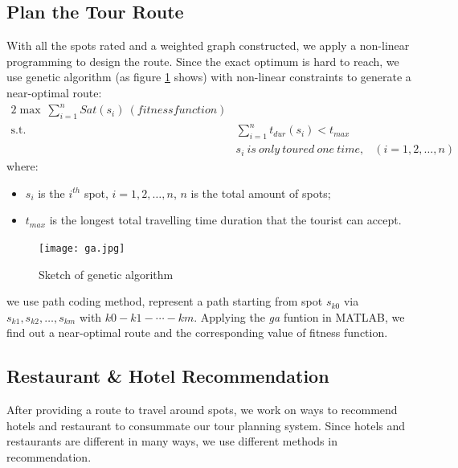 \documentclass{mcmthesis}
\begin{document}
\subsection{Plan the Tour Route}
  With all the spots rated and a weighted graph constructed, we apply a non-linear programming to design the route. Since the exact optimum is hard to reach, we use genetic algorithm (as figure \ref{fig:ga} shows) with non-linear constraints to generate a near-optimal route:
  \begin{alignat}{2}   %
    \max~\sum_{i=1}^{n}Sat(s_{i})~(fitness function)\\
    \mbox{s.t.}\quad
    &\sum_{i=1}^{n}t_{dur}(s_{i}) < t_{max}\\
    &s_{i}~is~only~toured~one~time, & (i=1,2,\ldots,n)
  \end{alignat}
  where:
  \begin{itemize}
    \item $s_{i}$ is the $i^{th}$ spot, $i=1,2,\ldots,n$, $n$ is the total amount of spots;
    \item $t_{max}$ is the longest total travelling time duration that the tourist can accept.
  \end{itemize}
  \begin{figure}[ht]
    \centering
    \texttt{[image: ga.jpg]}
    \caption{Sketch of genetic algorithm}
    \label{fig:ga}
  \end{figure}
  we use path coding method, represent a path starting from spot $s_{k0}$ via $s_{k1}, s_{k2},\ldots,s_{km}$ with $k0-k1-\cdots-km$. Applying the \emph{ga} funtion in MATLAB, we find out a near-optimal route and the corresponding value of fitness function.

  



\subsection{Restaurant \& Hotel Recommendation}
  After providing a route to travel around spots, we work on ways to recommend hotels and restaurant to consummate our tour planning system. Since hotels and restaurants are different in many ways, we use different methods in recommendation.
\end{document}
